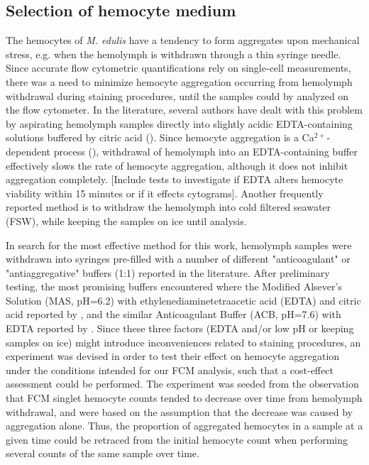 \subsection{Selection of hemocyte medium}
The hemocytes of \emph{M. edulis} have a tendency to form aggregates upon mechanical stress, e.g. when the hemolymph is withdrawn through a thin syringe needle. Since accurate flow cytometric quantifications rely on single-cell measurements, there was a need to minimize hemocyte aggregation occurring from hemolymph withdrawal during staining procedures, until the samples could by analyzed on the flow cytometer. In the literature, several authors have dealt with this problem by aspirating hemolymph samples directly into slightly acidic EDTA-containing solutions buffered by citric acid (\cite{Söderhall1983, Bachere1988, LeFoll2010}). Since hemocyte aggregation is a Ca$^{2+}$-dependent process (\cite{Rolton2020}), withdrawal of hemolymph into an EDTA-containing buffer effectively slows the rate of hemocyte aggregation, although it does not inhibit aggregation completely. [Include tests to investigate if EDTA alters hemocyte viability within 15 minutes or if it effects cytograms]. Another frequently reported method is to withdraw the hemolymph into cold filtered seawater (FSW), while keeping the samples on ice until analysis.

In search for the most effective method for this work, hemolymph samples were withdrawn into syringes pre-filled with a number of different "anticoagulant" or "antiaggregative" buffers (1:1) reported in the literature. After preliminary testing, the most promising buffers encountered where the Modified Alsever's Solution (MAS, pH=6.2) with ethylenediaminetetraacetic acid (EDTA) and citric acid reported by \cite{LeFoll2010}, and the similar Anticoagulant Buffer (ACB, pH=7.6) with EDTA reported by \cite{Pipe1997}. Since these three factors (EDTA and/or low pH or keeping samples on ice) might introduce inconveniences related to staining procedures, an experiment was devised in order to test their effect on hemocyte aggregation under the conditions intended for our FCM analysis, such that a cost-effect assessment could be performed. The experiment was seeded from the observation that FCM singlet hemocyte counts tended to decrease over time from hemolymph withdrawal, and were based on the assumption that the decrease was caused by aggregation alone. Thus, the proportion of aggregated hemocytes in a sample at a given time could be retraced from the initial hemocyte count when performing several counts of the same sample over time. 

